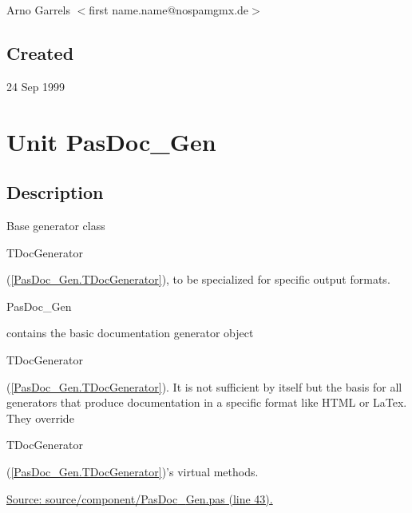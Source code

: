 \documentclass{report}
\begin{document}
\par
Arno Garrels {$<$}first name.name@nospamgmx.de{$>$}

\section{Created}
\par
24 Sep 1999


\chapter{Unit PasDoc{\_}Gen}
\label{PasDoc_Gen}
\section{Description}
Base generator class \begin{ttfamily}TDocGenerator\end{ttfamily}(\ref{PasDoc_Gen.TDocGenerator}), to be specialized for specific output formats.\hfill\vspace*{1ex}

             

\begin{ttfamily}PasDoc{\_}Gen\end{ttfamily} contains the basic documentation generator object \begin{ttfamily}TDocGenerator\end{ttfamily}(\ref{PasDoc_Gen.TDocGenerator}). It is not sufficient by itself but the basis for all generators that produce documentation in a specific format like HTML or LaTex. They override \begin{ttfamily}TDocGenerator\end{ttfamily}(\ref{PasDoc_Gen.TDocGenerator})'s virtual methods.\par
\href{https://github.com/pasdoc/pasdoc/blob/master/source/component/PasDoc_Gen.pas#L43}{Source: source/component/PasDoc{\_}Gen.pas (line 43).}
\end{document}
